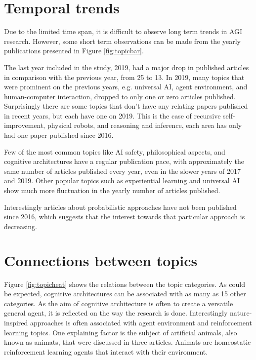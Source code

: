 \section{Temporal trends}

Due to the limited time span, it is difficult to observe long term trends in AGI
research. However, some short term observations can be made from the yearly
publications presented in Figure \ref{fig:topicbar}. 

The last year included in the study, 2019, had a major drop in published
articles in comparison with the previous year, from 25 to 13. In 2019, many
topics that were prominent on the previous years, e.g. universal AI, agent
environment, and human-computer interaction, dropped to only one or zero
articles published. Surprisingly there are some topics that don't have any
relating papers published in recent years, but each have one on 2019. This is
the case of recursive self-improvement, physical robots, and reasoning and
inference, each area has only had one paper published since 2016.

Few of the most common topics like AI safety, philosophical aspects, and
cognitive architectures have a regular publication pace, with approximately the
same number of articles published every year, even in the slower years of 2017
and 2019. Other popular topics such as experiential learning and universal AI
show much more fluctuation in the yearly number of articles published.

Interestingly articles about probabilistic approaches have not been published
since 2016, which suggests that the interest towards that particular approach is
decreasing.


\section{Connections between topics}

Figure \ref{fig:topicheat} shows the relations between the topic categories. As
could be expected, cognitive architectures can be associated with as many as 15
other categories. As the aim of cognitive architecture is often to create a
versatile general agent, it is reflected on the way the research is done.
Interestingly nature-inspired approaches is often associated with agent
environment and reinforcement learning topics. One explaining factor is the
subject of artificial animals, also known as animats, that were discussed in
three articles. Animats are homeostatic reinforcement learning agents that
interact with their environment. 

